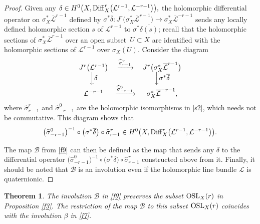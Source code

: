 \documentclass[10pt,a4paper]{amsart}
\numberwithin{equation}{section}
\newtheorem{Theorem}{Theorem}[section]
\begin{document}
\begin{proof} Given any $
\delta \in H^0\bigl(X, {\rm Diff}^r_X\bigl({\mathcal L}^{r-1},
{\mathcal L}^{-r-1}\bigr)\bigr),
$
the holomorphic differential operator on $\sigma^*_X \overline{\mathcal L}^{r-1}$ defined by
$
\sigma^*\overline{\delta}\colon J^r\bigl(\sigma^*_X \overline{\mathcal L}^{r-1}\bigr)
 \longrightarrow \sigma^*_X \overline{\mathcal L}^{-r-1}
$
sends any locally defined holomorphic section $s$ of ${\mathcal L}^{r-1}$ to
$\sigma^*\overline{\delta (s)}$; recall that the holomorphic sections of
$\sigma^*_X \overline{\mathcal L}^{r-1}$ over an open subset~$U \subset X$ are identified with the
holomorphic sections of ${\mathcal L}^{r-1}$ over $\sigma_X(U)$.
Consider the diagram
\[
\begin{matrix}
J^r\bigl({\mathcal L}^{r-1}\bigr) &\xrightarrow{\widehat{\sigma}^r_{r-1}} &
J^r\bigl(\sigma^*_X \overline{\mathcal L}^{r-1}\bigr)\\
 \Big\downarrow \delta && \Big\downarrow \sigma^*\overline{\delta}\\
{\mathcal L}^{-r-1} &\xrightarrow{\widehat{\sigma}^0_{-r-1}}&
\sigma^*_X \overline{\mathcal L}^{-r-1},
\end{matrix}
\]
where $\widehat{\sigma}^r_{r-1}$ and $\widehat{\sigma}^0_{-r-1}$ are the holomorphic isomorphisms
in \eqref{s2}, which needs not be commutative. This diagram shows that
\[
\bigl(\widehat{\sigma}^0_{-r-1}\bigr)^{-1}\circ \bigl(\sigma^*\overline{\delta}\bigr) \circ\widehat{\sigma}^r_{r-1}
 \in H^0\bigl(X, {\rm Diff}^r_X\bigl({\mathcal L}^{r-1}, {\mathcal L}^{-r-1}\bigr)\bigr).
\]

The map ${\mathcal B}$ from \eqref{f9} can then be defined as
the map that sends any $\delta$ to the differential operator
$\bigl(\widehat{\sigma}^0_{-r-1}\bigr)^{-1}\circ \bigl(\sigma^*\overline{\delta}\bigr)
\circ\widehat{\sigma}^r_{r-1}$ constructed above from it.
Finally, it should be noted that ${\mathcal B}$ is an
involution even if the holomorphic line bundle $\mathcal L$ is quaternionic.
\end{proof}

\begin{Theorem}\label{prop2}
The involution $\mathcal B$ in \eqref{f9} preserves the subset ${\rm OSL}_X(r)$ in Proposition {\rm \ref{f3}}.
The restriction of the map $\mathcal B$ to this subset ${\rm OSL}_X(r)$ coincides with the
involution $\beta$ in \eqref{f7}.
\end{Theorem}
\end{document}
